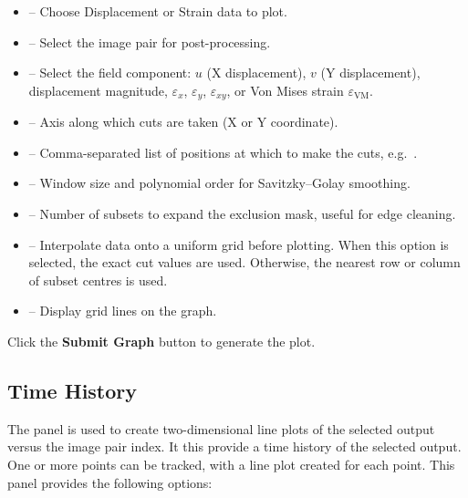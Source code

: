 \begin{itemize}
	\item {} -- Choose Displacement or Strain data to plot.
	\item {} -- Select the image pair for post-processing.
	\item {} -- Select the field component: $u$ (X displacement), $v$ (Y displacement), displacement magnitude, $\varepsilon_x$, $\varepsilon_y$, $\varepsilon_{xy}$, or Von Mises strain $\varepsilon_\text{VM}$.
	\item {} -- Axis along which cuts are taken (X or Y coordinate).
	\item {} -- Comma-separated list of positions at which to make the cuts, e.g.\ .
	\item {} -- Window size and polynomial order for Savitzky--Golay smoothing.
	\item {} -- Number of subsets to expand the exclusion mask, useful for edge cleaning.
	\item {} -- Interpolate data onto a uniform grid before plotting. When this option is selected, the exact cut values are used. Otherwise, the nearest row or column of subset centres is used.
	\item {} -- Display grid lines on the graph.
\end{itemize}

Click the \textbf{Submit Graph} button to generate the plot.

\subsection{Time History}

The  panel is used to create two-dimensional line plots of the selected output versus the image pair index.  It this provide a time history of the selected output.  One or more points can be tracked, with a line plot created for each point.  This panel provides the following options:

